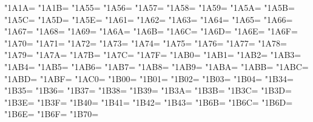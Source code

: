 \XeTeXcharclass"1A1A=\KclassCM
\XeTeXcharclass"1A1B=\KclassCM
\XeTeXcharclass"1A55=\KclassCM
\XeTeXcharclass"1A56=\KclassCM
\XeTeXcharclass"1A57=\KclassCM
\XeTeXcharclass"1A58=\KclassCM
\XeTeXcharclass"1A59=\KclassCM
\XeTeXcharclass"1A5A=\KclassCM
\XeTeXcharclass"1A5B=\KclassCM
\XeTeXcharclass"1A5C=\KclassCM
\XeTeXcharclass"1A5D=\KclassCM
\XeTeXcharclass"1A5E=\KclassCM
\XeTeXcharclass"1A61=\KclassCM
\XeTeXcharclass"1A62=\KclassCM
\XeTeXcharclass"1A63=\KclassCM
\XeTeXcharclass"1A64=\KclassCM
\XeTeXcharclass"1A65=\KclassCM
\XeTeXcharclass"1A66=\KclassCM
\XeTeXcharclass"1A67=\KclassCM
\XeTeXcharclass"1A68=\KclassCM
\XeTeXcharclass"1A69=\KclassCM
\XeTeXcharclass"1A6A=\KclassCM
\XeTeXcharclass"1A6B=\KclassCM
\XeTeXcharclass"1A6C=\KclassCM
\XeTeXcharclass"1A6D=\KclassCM
\XeTeXcharclass"1A6E=\KclassCM
\XeTeXcharclass"1A6F=\KclassCM
\XeTeXcharclass"1A70=\KclassCM
\XeTeXcharclass"1A71=\KclassCM
\XeTeXcharclass"1A72=\KclassCM
\XeTeXcharclass"1A73=\KclassCM
\XeTeXcharclass"1A74=\KclassCM
\XeTeXcharclass"1A75=\KclassCM
\XeTeXcharclass"1A76=\KclassCM
\XeTeXcharclass"1A77=\KclassCM
\XeTeXcharclass"1A78=\KclassCM
\XeTeXcharclass"1A79=\KclassCM
\XeTeXcharclass"1A7A=\KclassCM
\XeTeXcharclass"1A7B=\KclassCM
\XeTeXcharclass"1A7C=\KclassCM
\XeTeXcharclass"1A7F=\KclassCM
\XeTeXcharclass"1AB0=\KclassCM
\XeTeXcharclass"1AB1=\KclassCM
\XeTeXcharclass"1AB2=\KclassCM
\XeTeXcharclass"1AB3=\KclassCM
\XeTeXcharclass"1AB4=\KclassCM
\XeTeXcharclass"1AB5=\KclassCM
\XeTeXcharclass"1AB6=\KclassCM
\XeTeXcharclass"1AB7=\KclassCM
\XeTeXcharclass"1AB8=\KclassCM
\XeTeXcharclass"1AB9=\KclassCM
\XeTeXcharclass"1ABA=\KclassCM
\XeTeXcharclass"1ABB=\KclassCM
\XeTeXcharclass"1ABC=\KclassCM
\XeTeXcharclass"1ABD=\KclassCM
\XeTeXcharclass"1ABF=\KclassCM
\XeTeXcharclass"1AC0=\KclassCM
\XeTeXcharclass"1B00=\KclassCM
\XeTeXcharclass"1B01=\KclassCM
\XeTeXcharclass"1B02=\KclassCM
\XeTeXcharclass"1B03=\KclassCM
\XeTeXcharclass"1B04=\KclassCM
\XeTeXcharclass"1B34=\KclassCM
\XeTeXcharclass"1B35=\KclassCM
\XeTeXcharclass"1B36=\KclassCM
\XeTeXcharclass"1B37=\KclassCM
\XeTeXcharclass"1B38=\KclassCM
\XeTeXcharclass"1B39=\KclassCM
\XeTeXcharclass"1B3A=\KclassCM
\XeTeXcharclass"1B3B=\KclassCM
\XeTeXcharclass"1B3C=\KclassCM
\XeTeXcharclass"1B3D=\KclassCM
\XeTeXcharclass"1B3E=\KclassCM
\XeTeXcharclass"1B3F=\KclassCM
\XeTeXcharclass"1B40=\KclassCM
\XeTeXcharclass"1B41=\KclassCM
\XeTeXcharclass"1B42=\KclassCM
\XeTeXcharclass"1B43=\KclassCM
\XeTeXcharclass"1B6B=\KclassCM
\XeTeXcharclass"1B6C=\KclassCM
\XeTeXcharclass"1B6D=\KclassCM
\XeTeXcharclass"1B6E=\KclassCM
\XeTeXcharclass"1B6F=\KclassCM
\XeTeXcharclass"1B70=\KclassCM
